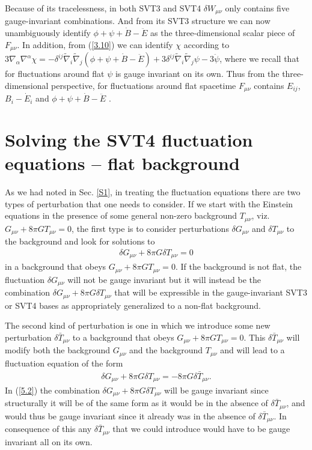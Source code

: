 \documentclass[aps,onecolumn,10pt]{revtex4}
\numberwithin{equation}{section}
\numberwithin{equation}{section}
\begin{document}
Because of its tracelessness, in both SVT3 and SVT4 $\delta W_{\mu\nu}$ only contains five gauge-invariant combinations. And from its SVT3 structure we can now unambiguously identify $\phi + \psi +\dot{B}-\ddot{E}$ as the three-dimensional scalar piece of $F_{\mu\nu}$. In addition, from (\ref{3.10}) we can identify $\chi$ according to $3\nabla_{\alpha}\nabla^{\alpha}\chi=-\delta^{ij}\tilde{\nabla}_i\tilde{\nabla}_j(\phi  +\psi +\dot{B}-\ddot{E})+3\delta^{ij}\tilde{\nabla}_{i}\tilde{\nabla}_{j}\psi-3\ddot{\psi}$, where we recall that for fluctuations around flat $\psi$ is gauge invariant on its own. Thus from the three-dimensional perspective, for fluctuations around flat spacetime $F_{\mu\nu}$ contains $E_{ij}$, $B_i-\dot{E}_i$ and $\phi + \psi +\dot{B}-\ddot{E}$ \cite{footnote7}. 

\section{Solving the SVT4 fluctuation equations -- flat background}
\label{S5}

As we had noted in Sec. \ref{S1}, in treating the fluctuation equations there are two types of perturbation that one needs to consider. If we start with the Einstein equations in the presence of some general non-zero background $T_{\mu\nu}$, viz. $G_{\mu\nu}+8\pi G T_{\mu\nu}=0$, the first type is to consider perturbations $\delta G_{\mu\nu}$ and $\delta T_{\mu\nu}$ to the background and look for solutions to  
%
\begin{eqnarray}
\delta G_{\mu\nu}+8\pi G \delta T_{\mu\nu}=0
\label{5.1}
\end{eqnarray}
%
in a background that obeys $G_{\mu\nu}+8\pi G T_{\mu\nu}=0$. If the background is not flat, the fluctuation $\delta G_{\mu\nu}$ will not be gauge invariant  but it will instead be the combination $\delta G_{\mu\nu}+8\pi G \delta T_{\mu\nu}$  that will be expressible in the gauge-invariant SVT3 or SVT4 bases as appropriately generalized to a non-flat background.

The second kind of perturbation is one in which we introduce some new perturbation $\delta \bar{T}_{\mu\nu}$ to a background that obeys $G_{\mu\nu}+8\pi G T_{\mu\nu}=0$. This $\delta \bar{T}_{\mu\nu}$ will modify both the background $G_{\mu\nu}$ and the background $T_{\mu\nu}$ and will lead to a fluctuation equation of the form 
%
\begin{eqnarray}
\delta G_{\mu\nu}+8\pi G \delta T_{\mu\nu}=-8 \pi G \delta \bar{T}_{\mu\nu}. 
\label{5.2}
\end{eqnarray}
%
In (\ref{5.2}) the combination $\delta G_{\mu\nu}+8\pi G \delta T_{\mu\nu}$ will be gauge invariant since structurally it will be of the same form as it would be in the absence of $\delta \bar{T}_{\mu\nu}$, and would thus be gauge invariant since it already was in the absence of $\delta \bar{T}_{\mu\nu}$. In consequence of this any $\delta \bar{T}_{\mu\nu}$ that we could introduce would have to be gauge invariant all on its own.
\end{document}
